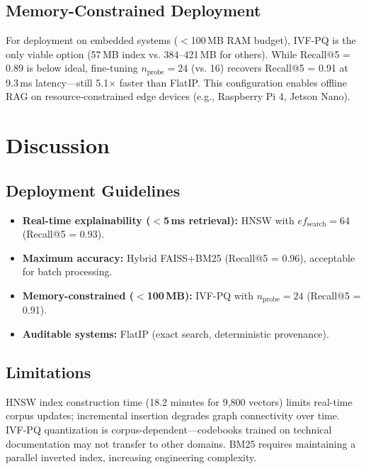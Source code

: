 \documentclass[conference]{IEEEtran}
\begin{document}
\subsection{Memory-Constrained Deployment}

For deployment on embedded systems ($<$100\,MB RAM budget), IVF-PQ is the only viable option (57\,MB index vs. 384--421\,MB for others). While Recall@5 = 0.89 is below ideal, fine-tuning $n_{\mathrm{probe}}{=}24$ (vs. 16) recovers Recall@5 = 0.91 at 9.3\,ms latency—still 5.1$\times$ faster than FlatIP. This configuration enables offline RAG on resource-constrained edge devices (e.g., Raspberry Pi 4, Jetson Nano).

\section{Discussion}

\subsection{Deployment Guidelines}

\begin{itemize}
\item \textbf{Real-time explainability ($<$5\,ms retrieval):} HNSW with $ef_{\mathrm{search}}{=}64$ (Recall@5 = 0.93).
\item \textbf{Maximum accuracy:} Hybrid FAISS+BM25 (Recall@5 = 0.96), acceptable for batch processing.
\item \textbf{Memory-constrained ($<$100\,MB):} IVF-PQ with $n_{\mathrm{probe}}{=}24$ (Recall@5 = 0.91).
\item \textbf{Auditable systems:} FlatIP (exact search, deterministic provenance).
\end{itemize}

\subsection{Limitations}

HNSW index construction time (18.2 minutes for 9,800 vectors) limits real-time corpus updates; incremental insertion degrades graph connectivity over time. IVF-PQ quantization is corpus-dependent—codebooks trained on technical documentation may not transfer to other domains. BM25 requires maintaining a parallel inverted index, increasing engineering complexity.
\end{document}
